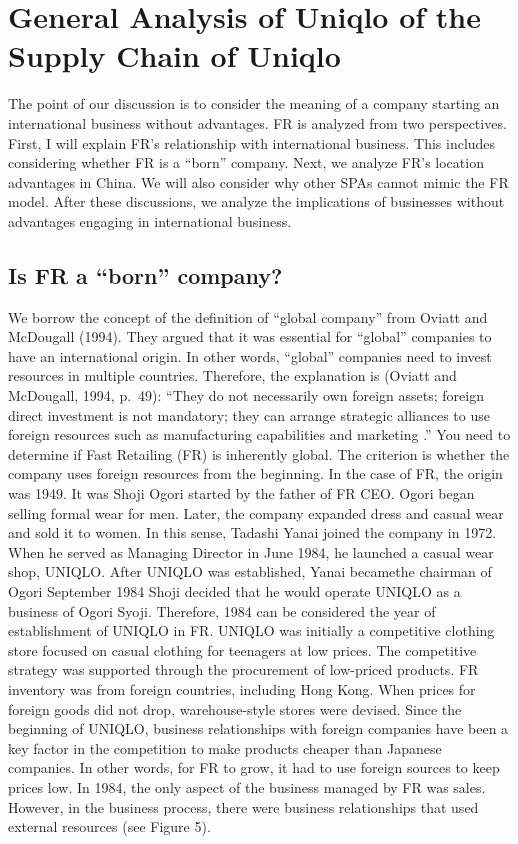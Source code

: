 \documentclass[12pt,]{article}
\begin{document}
\hypertarget{general-analysis-of-uniqlo-of-the-supply-chain-of-uniqlo}{%
\section{General Analysis of Uniqlo of the Supply Chain of
Uniqlo}\label{general-analysis-of-uniqlo-of-the-supply-chain-of-uniqlo}}

The point of our discussion is to consider the meaning of a company
starting an international business without advantages. FR is analyzed
from two perspectives. First, I will explain FR's relationship with
international business. This includes considering whether FR is a
``born'' company. Next, we analyze FR's location advantages in China. We
will also consider why other SPAs cannot mimic the FR model. After these
discussions, we analyze the implications of businesses without
advantages engaging in international business.

\hypertarget{is-fr-a-born-company}{%
\subsection{Is FR a ``born'' company?}\label{is-fr-a-born-company}}

We borrow the concept of the definition of ``global company'' from
Oviatt and McDougall (1994). They argued that it was essential for
``global'' companies to have an international origin. In other words,
``global'' companies need to invest resources in multiple countries.
Therefore, the explanation is (Oviatt and McDougall, 1994, p.~49):
``They do not necessarily own foreign assets; foreign direct investment
is not mandatory; they can arrange strategic alliances to use foreign
resources such as manufacturing capabilities and marketing .'' You need
to determine if Fast Retailing (FR) is inherently global. The criterion
is whether the company uses foreign resources from the beginning. In the
case of FR, the origin was 1949. It was Shoji Ogori started by the
father of FR CEO. Ogori began selling formal wear for men. Later, the
company expanded dress and casual wear and sold it to women. In this
sense, Tadashi Yanai joined the company in 1972. When he served as
Managing Director in June 1984, he launched a casual wear shop, UNIQLO.
After UNIQLO was established, Yanai becamethe chairman of Ogori
September 1984 Shoji decided that he would operate UNIQLO as a business
of Ogori Syoji. Therefore, 1984 can be considered the year of
establishment of UNIQLO in FR. UNIQLO was initially a competitive
clothing store focused on casual clothing for teenagers at low prices.
The competitive strategy was supported through the procurement of
low-priced products. FR inventory was from foreign countries, including
Hong Kong. When prices for foreign goods did not drop, warehouse-style
stores were devised. Since the beginning of UNIQLO, business
relationships with foreign companies have been a key factor in the
competition to make products cheaper than Japanese companies. In other
words, for FR to grow, it had to use foreign sources to keep prices low.
In 1984, the only aspect of the business managed by FR was sales.
However, in the business process, there were business relationships that
used external resources (see Figure 5).
\end{document}
